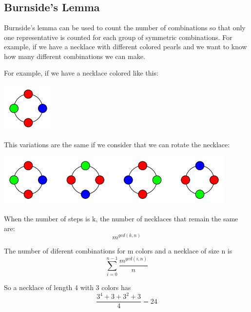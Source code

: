 \subsection{Burnside's Lemma}
Burnside’s lemma can be used to count the number of combinations so that
only one representative is counted for each group of symmetric combinations.
For example, if we have a necklace with different colored pearls and we want to know
how many different combinations we can make.

For example, if we have a necklace colored like this:

\begin{center}
    \includegraphics[scale=.6, keepaspectratio]{./Theory/images/burnside1.png}
\end{center}

This variations are the same if we consider that we can rotate the necklace:

\begin{center}
    \includegraphics[scale=.6, keepaspectratio]{./Theory/images/burnside2.png}
\end{center}

When the number of steps is k, the number of necklaces that remain the same are:
$$ m^{gcd(k, n)} $$

The number of diferent combinations for m colors and a necklace of size n is 
$$ \sum_{i=0}^{n - 1} \dfrac{m^{gcd(i, n)}}{n} $$

So a necklace of length 4 with 3 colors has
$$ \dfrac{3^{4} + 3 + 3^{2} + 3}{4} = 24 $$